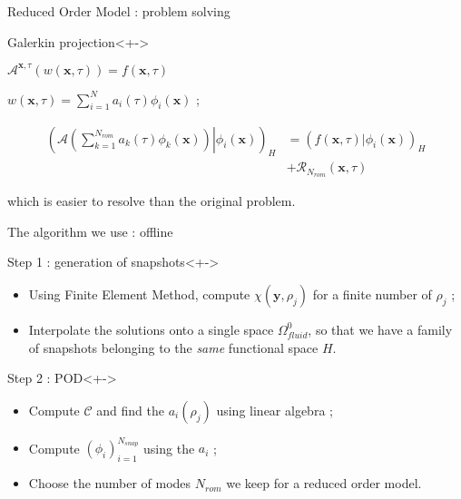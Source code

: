 \begin{frame}{Reduced Order Model : problem solving}
\begin{block}{Galerkin projection}<+->
%
\begin{description}
\item<+-> [For a given problem] $\mathcal{A}^{\mathbf{x},\tau}\left(w(\mathbf{x},\tau)\right)=f(\mathbf{x},\tau)$
\item<+-> [Decomposition] $w(\mathbf{x},\tau)=\sum\limits_{i=1}^N a_i(\tau)\phi_i(\mathbf{x})$ ;%
\item<+-> [The problem in $a_k$] %
\[%
\begin{split}
\left(\left.\mathcal{A}\left(\sum\limits_{k=1}^{N_{rom}} a_k(\tau)\phi_k(\mathbf{x})\right) \right|\phi_i\left(\mathbf{x}\right)\right)_H %
&= \left(f\left(\mathbf{x},\tau\right)|\phi_i(\mathbf{x})\right)_H\\%
&+\mathcal{R}_{N_{rom}}(\mathbf{x},\tau)
\end{split}
\]
\item<+-> [\dots] which is easier to resolve than the original problem.
\end{description}
%
\end{block}
%
\end{frame}

\begin{frame}{The algorithm we use : offline}
%
\begin{block}{Step 1 : generation of snapshots}<+->
\begin{itemize}
\item<+-> Using Finite Element Method, compute $\chi(\mathbf{y},\rho_j)$ for a finite number of $\rho_j$ ;
\item<+-> Interpolate the solutions onto a single space $\Omega_{fluid}^0$, %
so that we have a family of snapshots belonging to the \emph{same} functional space $H$.
\end{itemize}
\end{block}
%
\begin{block}{Step 2 : POD}<+->
\begin{itemize}
\item<+-> Compute $\mathcal{C}$ and find the $a_i(\rho_j)$ using linear algebra ;
\item<+-> Compute $(\phi_i)_{i=1}^{N_{snap}}$ using the $a_i$ ;
\item<+-> Choose the number of modes $N_{rom}$ we keep for a reduced order model.
\end{itemize}
\end{block}
%
\end{frame}

